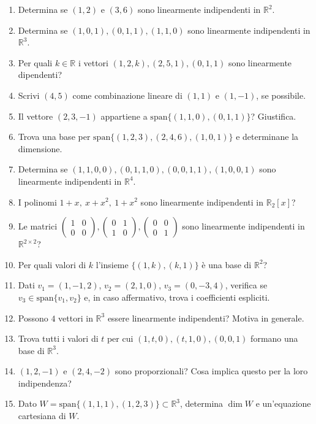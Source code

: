 \documentclass[a4paper,11pt]{article}
\begin{document}
\begin{enumerate}
  \item Determina se $(1,2)$ e $(3,6)$ sono linearmente indipendenti in $\mathbb R^2$.
  \item Determina se $(1,0,1),(0,1,1),(1,1,0)$ sono linearmente indipendenti in $\mathbb R^3$.
  \item Per quali $k\in\mathbb R$ i vettori $(1,2,k),(2,5,1),(0,1,1)$ sono linearmente dipendenti?
  \item Scrivi $(4,5)$ come combinazione lineare di $(1,1)$ e $(1,-1)$, se possibile.
  \item Il vettore $(2,3,-1)$ appartiene a $\mathrm{span}\{(1,1,0),(0,1,1)\}$? Giustifica.
  \item Trova una base per $\mathrm{span}\{(1,2,3),(2,4,6),(1,0,1)\}$ e determinane la dimensione.
  \item Determina se $(1,1,0,0),(0,1,1,0),(0,0,1,1),(1,0,0,1)$ sono linearmente indipendenti in $\mathbb R^4$.
  \item I polinomi $1+x,\ x+x^2,\ 1+x^2$ sono linearmente indipendenti in $\mathbb R_2[x]$?
  \item Le matrici $\begin{pmatrix}1&0\\0&0\end{pmatrix}, \begin{pmatrix}0&1\\1&0\end{pmatrix}, \begin{pmatrix}0&0\\0&1\end{pmatrix}$ sono linearmente indipendenti in $\mathbb R^{2\times2}$?
  \item Per quali valori di $k$ l'insieme $\{(1,k),(k,1)\}$ è una base di $\mathbb R^2$?
  \item Dati $v_1=(1,-1,2)$, $v_2=(2,1,0)$, $v_3=(0,-3,4)$, verifica se $v_3\in\mathrm{span}\{v_1,v_2\}$ e, in caso affermativo, trova i coefficienti espliciti.
  \item Possono $4$ vettori in $\mathbb R^3$ essere linearmente indipendenti? Motiva in generale.
  \item Trova tutti i valori di $t$ per cui $(1,t,0),(t,1,0),(0,0,1)$ formano una base di $\mathbb R^3$.
  \item $(1,2,-1)$ e $(2,4,-2)$ sono proporzionali? Cosa implica questo per la loro indipendenza?
  \item Dato $W=\mathrm{span}\{(1,1,1),(1,2,3)\}\subset\mathbb R^3$, determina $\dim W$ e un'equazione cartesiana di $W$.

\end{enumerate}
\end{document}
